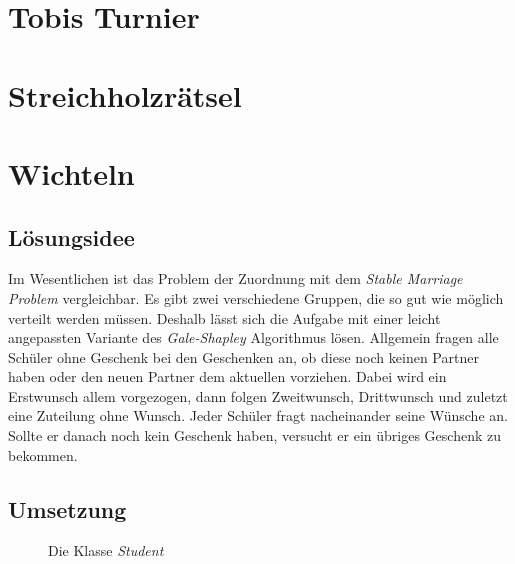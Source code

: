 \documentclass[a4paper, 12pt]{scrartcl}
\begin{document}
\section{Tobis Turnier}
\section{Streichholzrätsel}
\section{Wichteln}
\subsection{Lösungsidee}

Im Wesentlichen ist das Problem der Zuordnung mit dem \emph{Stable Marriage Problem} vergleichbar. Es gibt zwei verschiedene Gruppen, die so gut wie möglich verteilt werden müssen. Deshalb lässt sich die Aufgabe mit einer leicht angepassten Variante des \emph{Gale-Shapley} Algorithmus lösen. Allgemein fragen alle Schüler ohne Geschenk bei den Geschenken an, ob diese noch keinen Partner haben oder den neuen Partner dem aktuellen vorziehen. Dabei wird ein Erstwunsch allem vorgezogen, dann folgen Zweitwunsch, Drittwunsch und zuletzt eine Zuteilung ohne Wunsch. Jeder Schüler fragt nacheinander seine Wünsche an. Sollte er danach noch kein Geschenk haben, versucht er ein übriges Geschenk zu bekommen.

\subsection{Umsetzung}

\begin{figure}[h]
    \centering
    \caption{Die Klasse \emph{Student}}
\end{figure}
\end{document}
